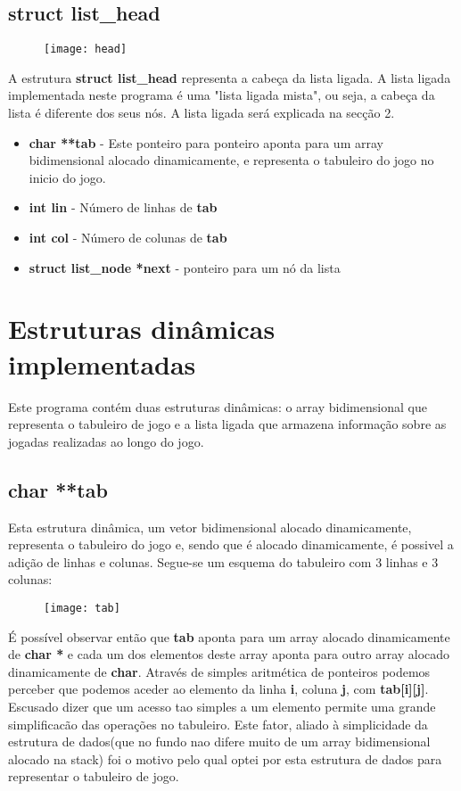 \documentclass[14pt]{extarticle}
\begin{document}
\newpage
\subsection{struct list\_head}
\begin{figure}[h]
    \centering
    \texttt{[image: head]}
\end{figure}
A estrutura \textbf{struct list\_head} representa a cabeça da lista ligada. A lista ligada implementada neste programa é uma "lista ligada mista", ou seja, a cabeça da lista é diferente dos seus nós. A lista ligada será explicada na secção 2.
\begin{itemize}
\item \textbf{char **tab} - Este ponteiro para ponteiro aponta para um array bidimensional alocado dinamicamente, e representa o tabuleiro do jogo no inicio do jogo.
\item \textbf{int lin} - Número de linhas de \textbf{tab}
\item \textbf{int col} - Número de colunas de \textbf{tab}
\item \textbf{struct list\_node *next} - ponteiro para um nó da lista
\end{itemize}

\newpage
\section{Estruturas dinâmicas implementadas}
Este programa contém duas estruturas dinâmicas: o array bidimensional que representa o tabuleiro de jogo e a lista ligada que armazena informação sobre as jogadas realizadas ao longo do jogo.
\subsection{char **tab}
Esta estrutura dinâmica, um vetor bidimensional alocado dinamicamente, representa o tabuleiro do jogo e, sendo que é alocado dinamicamente, é possivel a adição de linhas e colunas. Segue-se um esquema do tabuleiro com 3 linhas e 3 colunas:
\begin{figure}[h]
    \centering
    \texttt{[image: tab]}
\end{figure}

É possível observar então que \textbf{tab} aponta para um array alocado dinamicamente de \textbf{char *} e cada um dos elementos deste array aponta para outro array alocado dinamicamente de \textbf{char}. Através de simples aritmética de ponteiros podemos perceber que podemos aceder ao elemento da linha \textbf{i}, coluna \textbf{j}, com \textbf{tab[i][j]}. 
Escusado dizer que um acesso tao simples a um elemento permite uma grande simplificacão das operações no tabuleiro. Este fator, aliado à simplicidade da estrutura de dados(que no fundo nao difere muito de um array bidimensional alocado na stack) foi o motivo pelo qual optei por esta estrutura de dados para representar o tabuleiro de jogo. 
\end{document}
